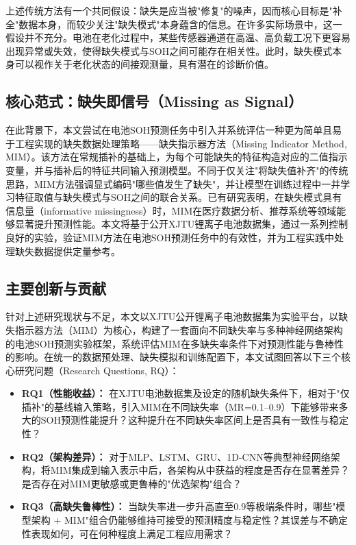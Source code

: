 \documentclass[10pt,a4paper]{ctexart}
\begin{document}
上述传统方法有一个共同假设：缺失是应当被"修复"的噪声，因而核心目标是"补全"数据本身，而较少关注"缺失模式"本身蕴含的信息。在许多实际场景中，这一假设并不充分。电池在老化过程中，某些传感器通道在高温、高负载工况下更容易出现异常或失效，使得缺失模式与SOH之间可能存在相关性。此时，缺失模式本身可以视作关于老化状态的间接观测量，具有潜在的诊断价值。

\subsection{核心范式：缺失即信号（Missing as Signal）}

在此背景下，本文尝试在电池SOH预测任务中引入并系统评估一种更为简单且易于工程实现的缺失数据处理策略——缺失指示器方法（Missing Indicator Method, MIM）\cite{jones1996indicator,van2023missing}。该方法在常规插补的基础上，为每个可能缺失的特征构造对应的二值指示变量，并与插补后的特征共同输入预测模型。不同于仅关注"将缺失值补齐"的传统思路，MIM方法强调显式编码"哪些值发生了缺失"，并让模型在训练过程中一并学习特征取值与缺失模式与SOH之间的联合关系。已有研究表明，在缺失模式具有信息量（informative missingness）时，MIM在医疗数据分析、推荐系统等领域能够显著提升预测性能\cite{sisk2023imputation,ehrig2025imputation}。本文将基于公开XJTU锂离子电池数据集，通过一系列控制良好的实验，验证MIM方法在电池SOH预测任务中的有效性，并为工程实践中处理缺失数据提供定量参考。

\subsection{主要创新与贡献}

针对上述研究现状与不足，本文以XJTU公开锂离子电池数据集为实验平台，以缺失指示器方法（MIM）为核心，构建了一套面向不同缺失率与多种神经网络架构的电池SOH预测实验框架，系统评估MIM在多缺失率条件下对预测性能与鲁棒性的影响。在统一的数据预处理、缺失模拟和训练配置下，本文试图回答以下三个核心研究问题（Research Questions, RQ）：

\begin{itemize}[leftmargin=2em]
    \item \textbf{RQ1（性能收益）：} 在XJTU电池数据集及设定的随机缺失条件下，相对于"仅插补"的基线输入策略，引入MIM在不同缺失率（MR=0.1--0.9）下能够带来多大的SOH预测性能提升？这种提升在不同缺失率区间上是否具有一致性与稳定性？
    
    \item \textbf{RQ2（架构差异）：} 对于MLP、LSTM、GRU、1D-CNN等典型神经网络架构，将MIM集成到输入表示中后，各架构从中获益的程度是否存在显著差异？是否存在对MIM更敏感或更鲁棒的"优选架构"组合？
    
    \item \textbf{RQ3（高缺失鲁棒性）：} 当缺失率进一步升高直至0.9等极端条件时，哪些"模型架构 + MIM"组合仍能够维持可接受的预测精度与稳定性？其误差与不确定性表现如何，可在何种程度上满足工程应用需求？
\end{itemize}
\end{document}

